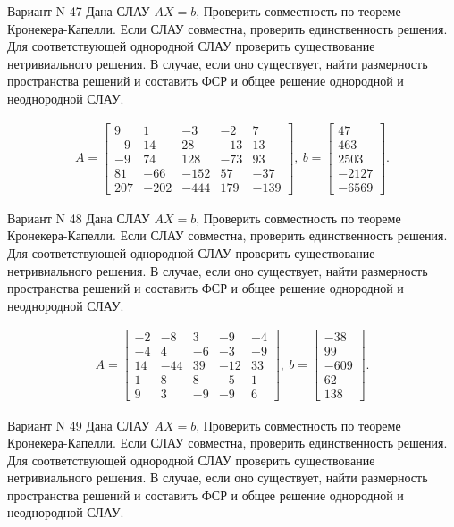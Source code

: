 \documentclass[11pt]{report}
\begin{document}
Вариант N 47
Дана СЛАУ $AX = b$,
Проверить совместность по теореме Кронекера-Капелли. Если СЛАУ совместна, проверить единственность решения.
Для соответствующей однородной СЛАУ проверить существование нетривиального решения. В случае, если оно существует,
найти размерность пространства решений и составить ФСР и общее решение однородной  и неоднородной СЛАУ.


\begin{align*}
 A = \left[\begin{matrix}9 & 1 & -3 & -2 & 7\\-9 & 14 & 28 & -13 & 13\\-9 & 74 & 128 & -73 & 93\\81 & -66 & -152 & 57 & -37\\207 & -202 & -444 & 179 & -139\end{matrix}\right],
\ b = \left[\begin{matrix}47\\463\\2503\\-2127\\-6569\end{matrix}\right]. 
 \end{align*}

Вариант N 48
Дана СЛАУ $AX = b$,
Проверить совместность по теореме Кронекера-Капелли. Если СЛАУ совместна, проверить единственность решения.
Для соответствующей однородной СЛАУ проверить существование нетривиального решения. В случае, если оно существует,
найти размерность пространства решений и составить ФСР и общее решение однородной  и неоднородной СЛАУ.


\begin{align*}
 A = \left[\begin{matrix}-2 & -8 & 3 & -9 & -4\\-4 & 4 & -6 & -3 & -9\\14 & -44 & 39 & -12 & 33\\1 & 8 & 8 & -5 & 1\\9 & 3 & -9 & -9 & 6\end{matrix}\right],
\ b = \left[\begin{matrix}-38\\99\\-609\\62\\138\end{matrix}\right]. 
 \end{align*}

Вариант N 49
Дана СЛАУ $AX = b$,
Проверить совместность по теореме Кронекера-Капелли. Если СЛАУ совместна, проверить единственность решения.
Для соответствующей однородной СЛАУ проверить существование нетривиального решения. В случае, если оно существует,
найти размерность пространства решений и составить ФСР и общее решение однородной  и неоднородной СЛАУ.
\end{document}
